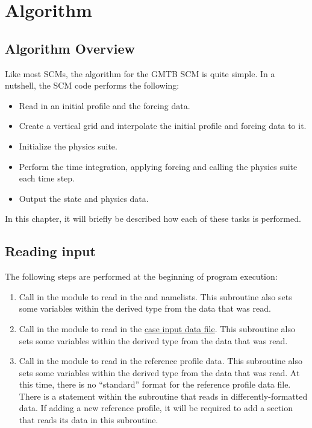 \chapter{Algorithm}
\label{chapter: algorithm}
\setlength{\parskip}{12pt}

\section{Algorithm Overview}

Like most SCMs, the algorithm for the GMTB SCM is quite simple. In a nutshell, the SCM code performs the following:
\begin{itemize}
\item Read in an initial profile and the forcing data.
\item Create a vertical grid and interpolate the initial profile and forcing data to it.
\item Initialize the physics suite.
\item Perform the time integration, applying forcing and calling the physics suite each time step.
\item Output the state and physics data.
\end{itemize}
In this chapter, it will briefly be described how each of these tasks is performed.

\section{Reading input}
The following steps are performed at the beginning of program execution:
\begin{enumerate}
\item Call  in the  module to read in the \hyperref[subsection: case config]{} and \hyperref[subsection: physics config]{} namelists. This subroutine also sets some variables within the  derived type from the data that was read.
\item Call  in the  module to read in the \hyperref[subsection: case input]{case input data file}. This subroutine also sets some variables within the  derived type from the data that was read.
\item Call  in the  module to read in the reference profile data. This subroutine also sets some variables within the  derived type from the data that was read. At this time, there is no ``standard'' format for the reference profile data file. There is a  statement within the  subroutine that reads in differently-formatted data. If adding a new reference profile, it will be required to add a section that reads its data in this subroutine.
\end{enumerate}

